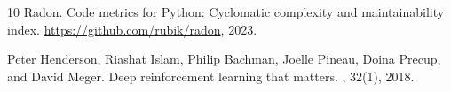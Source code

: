 \documentclass[sigconf,nonacm]{acmart}
\begin{document}
\begin{thebibliography}{10}
Radon.
\newblock Code metrics for Python: Cyclomatic complexity and maintainability index.
\newblock \url{https://github.com/rubik/radon}, 2023.

Peter Henderson, Riashat Islam, Philip Bachman, Joelle Pineau, Doina Precup, and David Meger.
\newblock Deep reinforcement learning that matters.
, 32(1), 2018.

\end{thebibliography}
\end{document}
